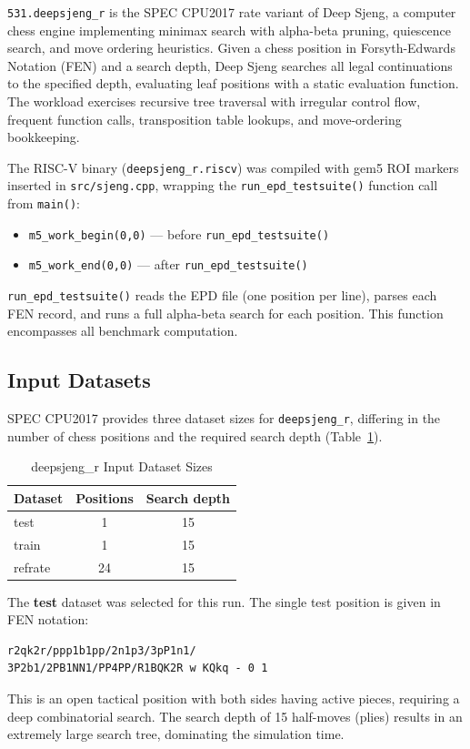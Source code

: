\documentclass[conference]{IEEEtran}
\begin{document}
\texttt{531.deepsjeng\_r} is the SPEC CPU2017 rate variant of Deep
Sjeng, a computer chess engine implementing minimax search with
alpha-beta pruning, quiescence search, and move ordering heuristics.
Given a chess position in Forsyth-Edwards Notation (FEN) and a search
depth, Deep Sjeng searches all legal continuations to the specified
depth, evaluating leaf positions with a static evaluation function.
The workload exercises recursive tree traversal with irregular control
flow, frequent function calls, transposition table lookups, and
move-ordering bookkeeping.

The RISC-V binary (\texttt{deepsjeng\_r.riscv}) was compiled with gem5
ROI markers inserted in \texttt{src/sjeng.cpp}, wrapping the
\texttt{run\_epd\_testsuite()} function call from \texttt{main()}:

\begin{itemize}
    \item \texttt{m5\_work\_begin(0,0)} --- before \texttt{run\_epd\_testsuite()}
    \item \texttt{m5\_work\_end(0,0)}   --- after  \texttt{run\_epd\_testsuite()}
\end{itemize}

\texttt{run\_epd\_testsuite()} reads the EPD file (one position per
line), parses each FEN record, and runs a full alpha-beta search for
each position. This function encompasses all benchmark computation.

\subsection{Input Datasets}

SPEC CPU2017 provides three dataset sizes for \texttt{deepsjeng\_r},
differing in the number of chess positions and the required search depth
(Table~\ref{tab:inputs}).

\begin{table}[H]
\centering
\caption{deepsjeng\_r Input Dataset Sizes}
\label{tab:inputs}
\begin{tabular}{lcc}
\toprule
\textbf{Dataset} & \textbf{Positions} & \textbf{Search depth} \\
\midrule
test    & 1  & 15 \\
train   & 1  & 15 \\
refrate & 24 & 15 \\
\bottomrule
\end{tabular}
\end{table}

The \textbf{test} dataset was selected for this run. The single test
position is given in FEN notation:
\begin{verbatim}
r2qk2r/ppp1b1pp/2n1p3/3pP1n1/
3P2b1/2PB1NN1/PP4PP/R1BQK2R w KQkq - 0 1
\end{verbatim}
This is an open tactical position with both sides having active pieces,
requiring a deep combinatorial search. The search depth of 15 half-moves
(plies) results in an extremely large search tree, dominating the
simulation time.
\end{document}
